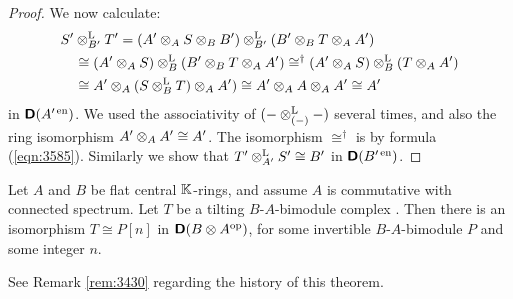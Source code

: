 \begin{proof}
We now calculate:
\[ \begin{aligned}
& S' \otimes^{\mathrm{L}}_{B'} T' = (A' \otimes_A S \otimes_B B') \otimes^{\mathrm{L}}_{B'}
(B' \otimes_B T \otimes_A A') 
\\
& \quad \cong (A' \otimes_A S) \otimes^{\mathrm{L}}_{B} (B' \otimes_B T \otimes_A A') 
\cong^{\dag} (A' \otimes_A S) \otimes^{\mathrm{L}}_{B} (T \otimes_A A') 
\\
& \quad \cong A' \otimes_A (S \otimes^{\mathrm{L}}_{B} T) \otimes_A A') 
\cong A' \otimes_A A \otimes_A A' \cong A'
\end{aligned} \]
in $\boldsymbol{\mathsf{D}}(A'^{\, \mathrm{en}})$. We used the associativity of 
$(- \otimes^{\mathrm{L}}_{(-)} -)$ several times, and also the ring isomorphism 
$A' \otimes_A A' \cong A'$. The isomorphism $\cong^{\dag}$ is by formula 
(\ref{eqn:3585}). Similarly we show that 
$T' \otimes^{\mathrm{L}}_{A'} S' \cong B'$
in $\boldsymbol{\mathsf{D}}(B'^{\, \mathrm{en}})$. 
\end{proof}

\begin{thm} \label{thm:3585}
Let $A$ and $B$ be flat central $\mathbb{K}$-rings, and assume $A$ is commutative with 
connected spectrum. Let $T$ be a tilting 
$B$-$A$-bimodule complex%
.
Then there is an isomorphism $T \cong P[n]$  
in $\boldsymbol{\mathsf{D}}(B \otimes A^{\mathrm{op}})$, for some 
invertible $B$-$A$-bimodule $P$ and some integer $n$. 
\end{thm}

See Remark \ref{rem:3430} regarding the history of this theorem. 

